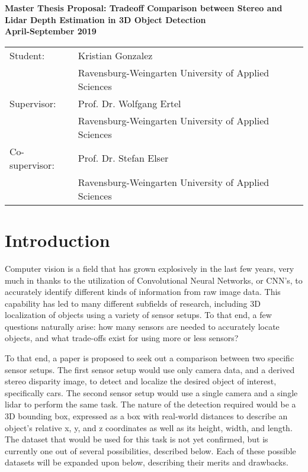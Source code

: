 \begin{center}
    \large
    \textbf{Master Thesis Proposal: Tradeoff Comparison between Stereo and Lidar Depth Estimation in 3D Object Detection}\\
    \noindent \textbf{April-September 2019}\\
    \normalsize 
\end{center}

\begin{tabular}{ll}
    Student: & Kristian Gonzalez \\
    & Ravensburg-Weingarten University of Applied Sciences\\
    Supervisor: & Prof. Dr. Wolfgang Ertel \\
    & Ravensburg-Weingarten University of Applied Sciences\\
    Co-supervisor: & Prof. Dr. Stefan Elser\\
    & Ravensburg-Weingarten University of Applied Sciences\\
\end{tabular}

\section{Introduction}
Computer vision is a field that has grown explosively in the last few years, very much in thanks to the utilization of Convolutional Neural Networks, or CNN's, to accurately identify different kinds of information from raw image data. This capability has led to many different subfields of research, including 3D localization of objects using a variety of sensor setups. To that end, a few questions naturally arise: how many sensors are needed to accurately locate objects, and what trade-offs exist for using more or less sensors?

To that end, a paper is proposed to seek out a comparison between two specific sensor setups. The first sensor setup would use only camera data, and a derived stereo disparity image, to detect and localize the desired object of interest, specifically cars. The second sensor setup would use a single camera and a single lidar to perform the same task. The nature of the detection required would be a 3D bounding box, expressed as a box with real-world distances to describe an object's relative x, y, and z coordinates as well as its height, width, and length. The dataset that would be used for this task is not yet confirmed, but is currently one out of several possibilities, described below. Each of these possible datasets will be expanded upon below, describing their merits and drawbacks.

